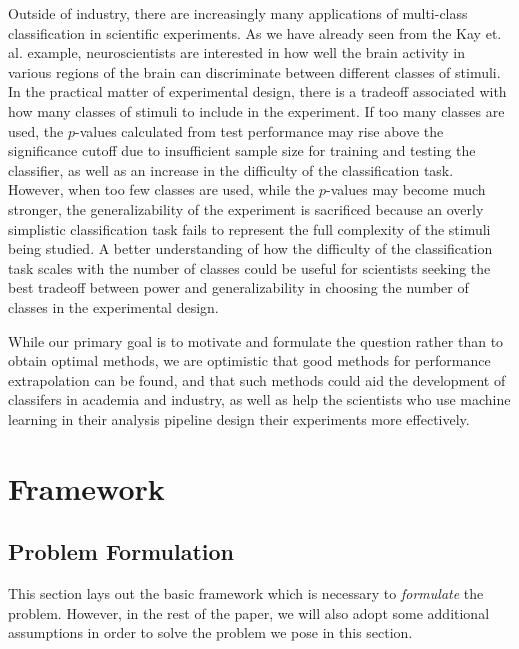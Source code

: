 \documentclass[12pt]{article}
\begin{document}
Outside of industry, there are increasingly many applications of
multi-class classification in scientific experiments.  As we have
already seen from the Kay et. al. example, neuroscientists are
interested in how well the brain activity in various regions of the
brain can discriminate between different classes of stimuli.  In the
practical matter of experimental design, there is a tradeoff
associated with how many classes of stimuli to include in the
experiment.  If too many classes are used, the $p$-values calculated
from test performance may rise above the significance cutoff due to
insufficient sample size for training and testing the classifier, as
well as an increase in the difficulty of the classification task.
However, when too few classes are used, while the $p$-values may
become much stronger, the generalizability of the experiment is
sacrificed because an overly simplistic classification task fails to
represent the full complexity of the stimuli being studied.  A better
understanding of how the difficulty of the classification task scales
with the number of classes could be useful for scientists seeking the
best tradeoff between power and generalizability in choosing the
number of classes in the experimental design.

While our primary goal is to motivate and formulate the question
rather than to obtain optimal methods, we are optimistic that good
methods for performance extrapolation can be found, and that such
methods could aid the development of classifers in academia and
industry, as well as help the scientists who use machine learning in
their analysis pipeline design their experiments more effectively.


\section{Framework}\label{sec:formulation}

\subsection{Problem Formulation}

This section lays out the basic framework which is necessary to
\emph{formulate} the problem.  However, in the rest of the paper, we
will also adopt some additional assumptions in order to solve the
problem we pose in this section.
\end{document}
